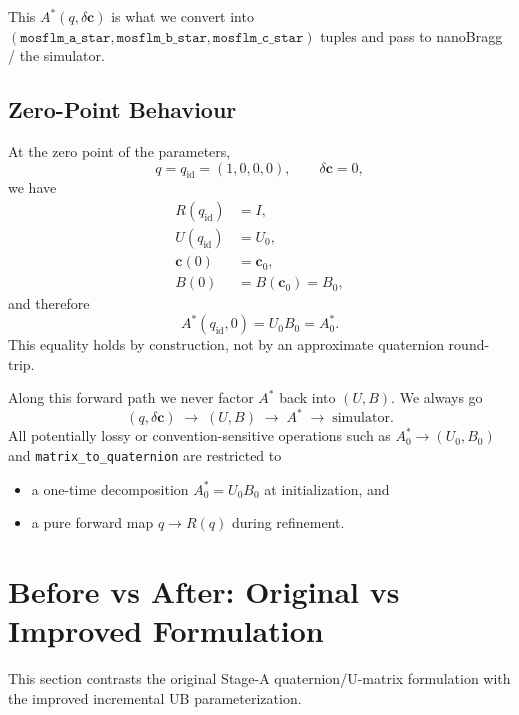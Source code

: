 \documentclass[11pt]{article}
\begin{document}
This $A^\ast(q,\delta\mathbf{c})$ is what we convert into
$(\texttt{mosflm\_a\_star}, \texttt{mosflm\_b\_star}, \texttt{mosflm\_c\_star})$
tuples and pass to nanoBragg / the simulator.

\subsection{Zero-Point Behaviour}

At the zero point of the parameters,
\begin{equation}
  q = q_{\text{id}} = (1,0,0,0), \qquad \delta\mathbf{c} = 0,
\end{equation}
we have
\begin{align}
  R(q_{\text{id}}) &= I, \\
  U(q_{\text{id}}) &= U_0, \\
  \mathbf{c}(0)    &= \mathbf{c}_0, \\
  B(0)             &= B(\mathbf{c}_0) = B_0,
\end{align}
and therefore
\begin{equation}
  A^\ast(q_{\text{id}}, 0) = U_0 B_0 = A^\ast_0.
\end{equation}
This equality holds by construction, not by an approximate quaternion
round-trip.

Along this forward path we never factor $A^\ast$ back into $(U,B)$.
We always go
\begin{equation}
  (q, \delta\mathbf{c})
  \;\longrightarrow\;
  (U,B)
  \;\longrightarrow\;
  A^\ast
  \;\longrightarrow\;
  \text{simulator}.
\end{equation}
All potentially lossy or convention-sensitive operations such as
$A^\ast_0 \to (U_0,B_0)$ and \verb|matrix_to_quaternion| are restricted to
\begin{itemize}
  \item a one-time decomposition $A^\ast_0 = U_0 B_0$ at initialization, and
  \item a pure forward map $q \to R(q)$ during refinement.
\end{itemize}

\section{Before vs After: Original vs Improved Formulation}

This section contrasts the original Stage-A quaternion/U-matrix formulation
with the improved incremental UB parameterization.
\end{document}
